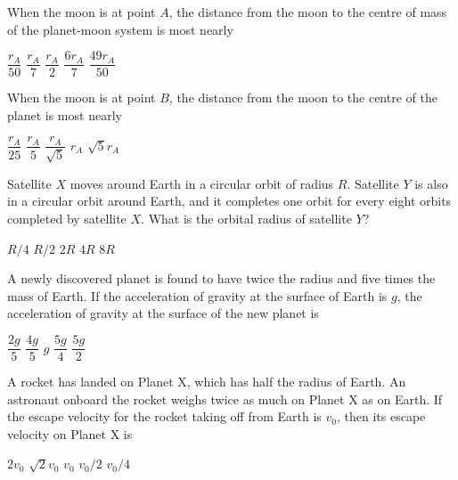 \documentclass[12pt]{../../oss-apphys-exam}
\begin{document}
\begin{questions}

  \question When the moon is at point $A$, the distance from the moon to the
  centre of mass of the planet-moon system is most nearly
  \begin{choices}
    \choice $\dfrac{r_A}{50}$
    \choice $\dfrac{r_A}7$
    \choice $\dfrac{r_A}2$
    \choice $\dfrac{6r_A}7$
    \choice $\dfrac{49r_A}{50}$
  \end{choices}
  \label{orbit1}
  
  \question When the moon is at point $B$, the distance from the moon to the
  centre of the planet is most nearly
  \begin{choices}
    \choice $\dfrac{r_A}{25}$
    \choice $\dfrac{r_A}5$
    \choice $\dfrac{r_A}{\sqrt5}$
    \choice $r_A$
    \choice $\sqrt5r_A$
  \end{choices}
  \label{orbit2}
  \newpage
    
  \question Satellite $X$ moves around Earth in a circular orbit of radius $R$.
  Satellite $Y$ is also in a circular orbit around Earth, and it completes one
  orbit for every eight orbits completed by satellite $X$. What is the
  orbital radius of satellite $Y$?
  \begin{choices}
    \choice $R/4$
    \choice $R/2$
    \choice $2R$
    \choice $4R$
    \choice $8R$
  \end{choices}
  \newpage

  \question A newly discovered planet is found to have twice the radius and five
  times the mass of Earth. If the acceleration of gravity at the surface of
  Earth is $g$, the acceleration of gravity at the surface of the new planet is
  \begin{choices}
    \choice $\dfrac{2g}5$
    \choice $\dfrac{4g}5$
    \choice $g$
    \choice $\dfrac{5g}4$
    \choice $\dfrac{5g}2$
  \end{choices}
  \newpage
  
  \question A rocket has landed on Planet X, which has half the radius of
  Earth. An astronaut onboard the rocket weighs twice as much on Planet X as on
  Earth. If the escape velocity for the rocket taking off from Earth is $v_0$,
  then its escape velocity on Planet X is
  \begin{choices}
    \choice $2v_0$
    \choice $\sqrt2 v_0$
    \choice $v_0$
    \choice $v_0/2$
    \choice $v_0/4$
  \end{choices}
  \newpage
  

\end{questions}
\end{document}
